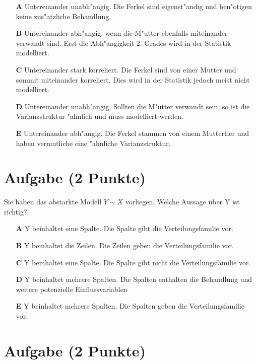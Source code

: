 \documentclass[a4paper, 10pt]{scrartcl}\usepackage[]{graphicx}\usepackage[]{color}
\begin{document}
\begin{enumerate}
\item [\textbf{A} \msquare] Untereinander unabh{"a}ngig. Die Ferkel sind eigenst{"a}ndig und ben{"o}tigen keine zus{"a}tzliche Behandlung.
\item [\textbf{B} \msquare] Untereinander abh{"a}ngig, wenn die M{"u}tter ebenfalls miteinander verwandt sind. Erst die Abh{"a}ngigkeit 2. Grades wird in der Statistik modelliert.
\item [\textbf{C} \msquare] Untereinander stark korreliert. Die Ferkel sind von einer Mutter und sommit miteinander korreliert. Dies wird in der Statistik jedoch meist nicht modelliert.
\item [\textbf{D} \msquare] Untereinander unabh{"a}ngig. Sollten die M{"u}tter verwandt sein, so ist die Varianzstruktur {"a}hnlich und muss modelliert werden.
\item [\textbf{E} \msquare] Untereinander abh{"a}ngig. Die Ferkel stammen von einem Muttertier und haben vermutliche eine {"a}hnliche Varianzstruktur.
\end{enumerate}

\section{Aufgabe \hfill (2 Punkte)}




Sie haben das abstarkte Modell $Y \sim X$ vorliegen. Welche Aussage {\"u}ber
Y ist richtig?



\begin{enumerate}
\item [\textbf{A} \msquare] Y beinhaltet eine Spalte. Die Spalte gibt die Verteilungsfamilie vor.
\item [\textbf{B} \msquare] Y beinhaltet die Zeilen. Die Zeilen geben die Verteilungsfamilie vor.
\item [\textbf{C} \msquare] Y beinhaltet eine Spalte. Die Spalte gibt nicht die Verteilungsfamilie vor.
\item [\textbf{D} \msquare] Y beinhaltet mehrere Spalten. Die Spalten enthalten die Behandlung und weitere potenzielle Einflussvariablen
\item [\textbf{E} \msquare] Y beinhaltet mehrere Spalten. Die Spalten geben die Verteilungsfamilie vor.
\end{enumerate}

\section{Aufgabe \hfill (2 Punkte)}
\end{document}
